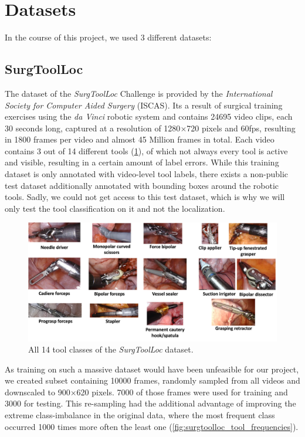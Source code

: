 \section{Datasets}
\label{sec:datasets}

In the course of this project, we used 3 different datasets:

\subsection{SurgToolLoc}
\label{ssec:datasets_surgtoolloc}
The dataset of the \emph{SurgToolLoc} Challenge is provided by the \emph{International Society for Computer Aided Surgery} (ISCAS). Its a result of surgical training exercises using the \emph{da Vinci} robotic system and contains \num{24695} video clips, each 30 seconds long, captured at a resolution of 1280$\times$720 pixels and 60fps, resulting in 1800 frames per video and almost 45 Million frames in total. Each video contains 3 out of 14 different tools (\ref{fig:surgtoolloc_tools}), of which not always every tool is active and visible, resulting in a certain amount of label errors. While this training dataset is only annotated with video-level tool labels, there exists a non-public test dataset additionally annotated with bounding boxes around the robotic tools. Sadly, we could not get access to this test dataset, which is why we will only test the tool classification on it and not the localization.

\begin{figure}[h]
	\centering
	\includegraphics[width=15cm]{4_experiments/images/datasets/surgtoolloc_tools.png}
	\caption{All 14 tool classes of the \emph{SurgToolLoc} dataset.}
	\label{fig:surgtoolloc_tools}
\end{figure}

As training on such a massive dataset would have been unfeasible for our project, we created subset containing \num{10000} frames, randomly sampled from all videos and downscaled to 900$\times$620 pixels. \num{7000} of those frames were used for training and \num{3000} for testing. This re-sampling had the additional advantage of improving the extreme class-imbalance in the original data, where the most frequent class occurred \num{1000} times more often the least one (\ref{fig:surgtoolloc_tool_frequencies}).

